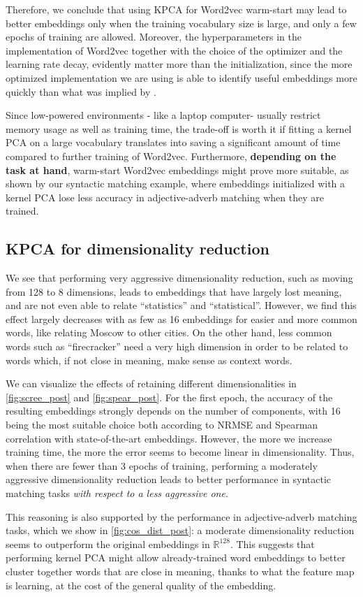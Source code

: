 Therefore, we conclude that using KPCA for Word2vec warm-start may lead to better embeddings only when the training vocabulary size is large, and only a few epochs of training are allowed. Moreover, the hyperparameters in the implementation of Word2vec together with the choice of the optimizer and the learning rate decay, evidently matter more than the initialization, since the more optimized implementation we are using is able to  identify useful embeddings more quickly than what was implied by \cite{gupta_improving_2019}.

Since low-powered environments - like a laptop computer- usually restrict memory usage as well as training time, the trade-off is worth it if fitting a kernel PCA on a large vocabulary translates into saving a significant amount of time compared to further training of Word2vec.
Furthermore, \textbf{depending on the task at hand}, warm-start Word2vec embeddings might prove more suitable, as shown by our syntactic matching example, where embeddings initialized with a kernel PCA lose less accuracy in adjective-adverb matching when they are trained.




\subsection{KPCA for dimensionality reduction}


We see that performing very aggressive dimensionality reduction, such as moving from 128 to 8 dimensions, leads to embeddings that have largely lost meaning, and are not even able to relate ``statistics'' and ``statistical''. However, we find this effect largely decreases with as few as 16 embeddings for easier and more common words, like relating Moscow to other cities. On the other hand, less common words such as ``firecracker'' need a very high dimension in order to be related to words which, if not close in meaning, make sense as context words. 

We can visualize the effects of retaining different dimensionalities in \cref{fig:scree_post} and \cref{fig:spear_post}. For the first epoch, the accuracy of the resulting embeddings strongly depends on the number of components, with 16 being the most suitable choice both according to NRMSE and Spearman correlation with state-of-the-art embeddings. However, the more we increase training time, the more the error seems to become linear in dimensionality. Thus, when there are fewer than 3 epochs of training, performing a moderately aggressive dimensionality reduction leads to better performance in syntactic matching tasks \emph{with respect to a less aggressive one}. 

This reasoning is also supported by the performance in adjective-adverb matching tasks, which we show in \cref{fig:cos_dist_post}: a moderate dimensionality reduction seems to outperform the original embeddings in $\mathbb{R}^{128}$. This suggests that performing kernel PCA might allow already-trained word embeddings to better cluster together words that are close in meaning, thanks to what the feature map is learning, at the cost of the general quality of the embedding.